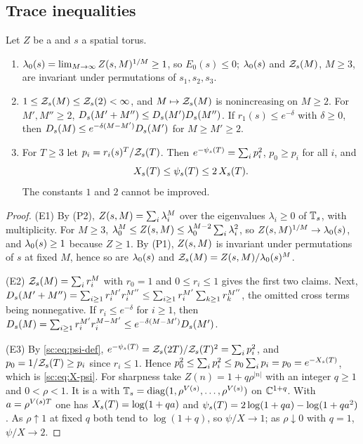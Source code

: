 \subsection{Trace inequalities}
\begin{lemma}\label{sc:lem:E1-E3}
Let $Z$ be a \PSTS{} and $s$ a spatial torus.
\begin{enumerate}[label=(E\arabic*),leftmargin=3em]
\item $\lambda_0(s)=\lim_{M\to\infty}Z(s,M)^{1/M}\ge1$, so $E_0(s)\le0$; $\lambda_0(s)$ and $\mathcal Z_{s}(M)$, $M\ge3$, are invariant under permutations of $s_1,s_2,s_3$.
\item $1\le\mathcal Z_{s}(M)\le\mathcal Z_{s}(2)<\infty$, and $M\mapsto\mathcal Z_{s}(M)$ is nonincreasing on $M\ge2$. For $M',M''\ge2$, $D_{s}(M'+M'')\le D_{s}(M')D_{s}(M'')$. If $r_1(s)\le e^{-\delta}$ with $\delta\ge0$, then $D_{s}(M)\le e^{-\delta(M-M')}D_{s}(M')$ for $M\ge M'\ge2$.
\item For $T\ge3$ let $p_i=r_i(s)^T/\mathcal Z_{s}(T)$. Then $e^{-\psi_{s}(T)}=\sum_ip_i^2$, $p_0\ge p_i$ for all $i$, and
\begin{equation}\label{sc:eq:X-psi}
X_{s}(T)\le\psi_{s}(T)\le2\,X_{s}(T).
\end{equation}
The constants $1$ and $2$ cannot be improved.
\end{enumerate}
\end{lemma}

\begin{proof}
(E1) By (P2), $Z(s,M)=\sum_i\lambda_i^M$ over the eigenvalues $\lambda_i\ge0$ of $\mathbb T_s$, with multiplicity. For $M\ge3$, $\lambda_0^M\le Z(s,M)\le\lambda_0^{M-2}\sum_i\lambda_i^2$, so $Z(s,M)^{1/M}\to\lambda_0(s)$, and $\lambda_0(s)\ge1$ because $Z\ge1$. By (P1), $Z(s,M)$ is invariant under permutations of $s$ at fixed $M$, hence so are $\lambda_0(s)$ and $\mathcal Z_{s}(M)=Z(s,M)/\lambda_0(s)^M$.

(E2) $\mathcal Z_{s}(M)=\sum_ir_i^M$ with $r_0=1$ and $0\le r_i\le1$ gives the first two claims. Next, $D_{s}(M'+M'')=\sum_{i\ge1}r_i^{M'}r_i^{M''}\le\sum_{i\ge1}r_i^{M'}\sum_{k\ge1}r_k^{M''}$, the omitted cross terms being nonnegative. If $r_i\le e^{-\delta}$ for $i\ge1$, then $D_{s}(M)=\sum_{i\ge1}r_i^{M'}r_i^{M-M'}\le e^{-\delta(M-M')}D_{s}(M')$.

(E3) By \eqref{sc:eq:psi-def}, $e^{-\psi_{s}(T)}=\mathcal Z_{s}(2T)/\mathcal Z_{s}(T)^2=\sum_ip_i^2$, and $p_0=1/\mathcal Z_{s}(T)\ge p_i$ since $r_i\le1$. Hence $p_0^2\le\sum_ip_i^2\le p_0\sum_ip_i=p_0=e^{-X_{s}(T)}$, which is \eqref{sc:eq:X-psi}. For sharpness take $Z(n)=1+q\rho^{|n|}$ with an integer $q\ge1$ and $0<\rho<1$. It is a \PSTS{} with $\mathbb T_s=\mathrm{diag}(1,\rho^{V(s)},\dots,\rho^{V(s)})$ on $\mathbb{C}^{1+q}$. With $a=\rho^{V(s)T}$ one has $X_{s}(T)=\log(1+qa)$ and $\psi_{s}(T)=2\log(1+qa)-\log(1+qa^2)$. As $\rho\uparrow1$ at fixed $q$ both tend to $\log(1+q)$, so $\psi/X\to1$; as $\rho\downarrow0$ with $q=1$, $\psi/X\to2$.
\end{proof}
